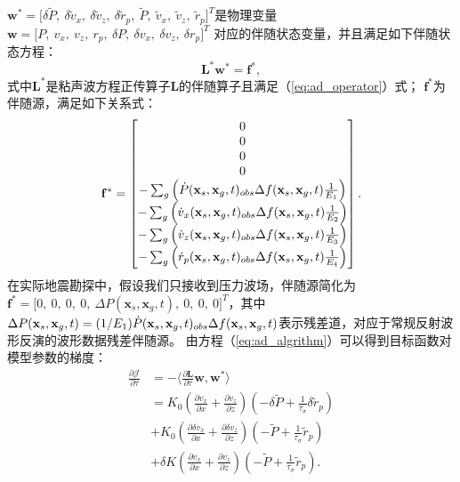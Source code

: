 $\mathbf{w}^\ast=\lbrack \delta\tilde{P}, \ \delta \tilde{v}_x, \ \delta \tilde{v}_z, \
\delta \tilde{r}_p, \ \tilde{P}, \ \tilde{v}_x, \ \tilde{v}_z, \ \tilde{r}_p\rbrack ^T$是物理变量
$\mathbf{w}=\lbrack P, \ v_x, \ v_z, \ r_p, \ \delta P, \ \delta v_x, \ \delta v_z, \ \delta r_p\rbrack ^T$
对应的伴随状态变量，并且满足如下伴随状态方程：
\begin{equation}
	\mathbf{L}^\ast\mathbf{w}^\ast=\mathbf{f}^\ast,
\end{equation}
式中$\mathbf{L}^\ast$是粘声波方程正传算子$\mathbf{L}$的伴随算子且满足（\ref{eq:ad_operator}）式；
$\mathbf{f}^\ast$为伴随源，满足如下关系式：
\begin{equation}
	\mathbf{f}^\ast=\begin{bmatrix} 0 \cr 0\cr 0\cr 0\cr
		-\sum_g\left(\dot{P}(\mathbf{x}_s,\mathbf{x}_g,t)_{obs}
		\Delta f(\mathbf{x}_s,\mathbf{x}_g,t)\frac{1}{E_1}\right) \cr
		-\sum_g\left(\dot{v}_x(\mathbf{x}_s,\mathbf{x}_g,t)_{obs}
		\Delta f(\mathbf{x}_s,\mathbf{x}_g,t)\frac{1}{E_2}\right) \cr
		-\sum_g\left(\dot{v}_z(\mathbf{x}_s,\mathbf{x}_g,t)_{obs}
		\Delta f(\mathbf{x}_s,\mathbf{x}_g,t)\frac{1}{E_3}\right) \cr
		-\sum_g\left(\dot{r}_p(\mathbf{x}_s,\mathbf{x}_g,t)_{obs}
		\Delta f(\mathbf{x}_s,\mathbf{x}_g,t)\frac{1}{E_4}\right) 
	\end{bmatrix}.
\end{equation}
在实际地震勘探中，假设我们只接收到压力波场，伴随源简化为\\
 $\mathbf{f}^\ast=\lbrack 0, \ 0, \ 0, \ 0, \
\Delta P(\mathbf{x}_s,\mathbf{x}_g,t), \ 0, \ 0, \ 0\rbrack ^T$，其中
$\Delta P(\mathbf{x}_s,\mathbf{x}_g,t)=(1/E_1)\dot{P}(\mathbf{x}_s,\mathbf{x}_g,t)_{obs}
 \\ \Delta f(\mathbf{x}_s,\mathbf{x}_g,t)$表示残差道，对应于常规反射波形反演的波形数据残差伴随源。
由方程（\ref{eq:ad_algrithm}）可以得到目标函数对模型参数的梯度：
   \begin{equation}
    \begin{aligned}
        \frac{\partial \mathcal{J}}{\partial \tau} &= -\langle\frac{\partial \mathbf{L}}{\partial\tau}
        \mathbf{w},\mathbf{w}^\ast \rangle \\
        &= {K_0(\frac{\partial v_x}{\partial
        x}+\frac{\partial v_z}{\partial
    z})(-\delta\tilde{P}+\frac{1}{\tau_\sigma}\delta\tilde{r}_p)} \\
    &{+K_0(\frac{\partial \delta v_x}{\partial x}+\frac{\partial \delta
        v_z}{\partial z})(-\tilde{P}+\frac{1}{\tau_\sigma}\tilde{r}_p)} \\
        &{+\delta K(\frac{\partial v_x}{\partial x}+\frac{\partial v_z}{\partial
        z})(-\tilde{P}+\frac{1}{\tau_\sigma}\tilde{r}_p)}.
    \end{aligned}
    \label{eq:gradient1}
    \end{equation}

